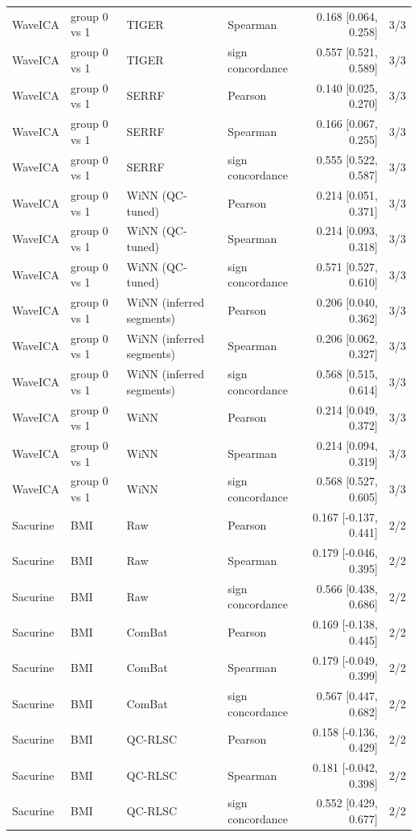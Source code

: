 \begin{landscape}
\begin{longtable}{llllrr}
WaveICA & group 0 vs 1 & TIGER & Spearman & 0.168 [0.064, 0.258] & 3/3 \\
WaveICA & group 0 vs 1 & TIGER & sign concordance & 0.557 [0.521, 0.589] & 3/3 \\
WaveICA & group 0 vs 1 & SERRF & Pearson & 0.140 [0.025, 0.270] & 3/3 \\
WaveICA & group 0 vs 1 & SERRF & Spearman & 0.166 [0.067, 0.255] & 3/3 \\
WaveICA & group 0 vs 1 & SERRF & sign concordance & 0.555 [0.522, 0.587] & 3/3 \\
WaveICA & group 0 vs 1 & WiNN (QC-tuned) & Pearson & 0.214 [0.051, 0.371] & 3/3 \\
WaveICA & group 0 vs 1 & WiNN (QC-tuned) & Spearman & 0.214 [0.093, 0.318] & 3/3 \\
WaveICA & group 0 vs 1 & WiNN (QC-tuned) & sign concordance & 0.571 [0.527, 0.610] & 3/3 \\
WaveICA & group 0 vs 1 & WiNN (inferred segments) & Pearson & 0.206 [0.040, 0.362] & 3/3 \\
WaveICA & group 0 vs 1 & WiNN (inferred segments) & Spearman & 0.206 [0.062, 0.327] & 3/3 \\
WaveICA & group 0 vs 1 & WiNN (inferred segments) & sign concordance & 0.568 [0.515, 0.614] & 3/3 \\
WaveICA & group 0 vs 1 & WiNN & Pearson & 0.214 [0.049, 0.372] & 3/3 \\
WaveICA & group 0 vs 1 & WiNN & Spearman & 0.214 [0.094, 0.319] & 3/3 \\
WaveICA & group 0 vs 1 & WiNN & sign concordance & 0.568 [0.527, 0.605] & 3/3 \\
Sacurine & BMI & Raw & Pearson & 0.167 [-0.137, 0.441] & 2/2 \\
Sacurine & BMI & Raw & Spearman & 0.179 [-0.046, 0.395] & 2/2 \\
Sacurine & BMI & Raw & sign concordance & 0.566 [0.438, 0.686] & 2/2 \\
Sacurine & BMI & ComBat & Pearson & 0.169 [-0.138, 0.445] & 2/2 \\
Sacurine & BMI & ComBat & Spearman & 0.179 [-0.049, 0.399] & 2/2 \\
Sacurine & BMI & ComBat & sign concordance & 0.567 [0.447, 0.682] & 2/2 \\
Sacurine & BMI & QC-RLSC & Pearson & 0.158 [-0.136, 0.429] & 2/2 \\
Sacurine & BMI & QC-RLSC & Spearman & 0.181 [-0.042, 0.398] & 2/2 \\
Sacurine & BMI & QC-RLSC & sign concordance & 0.552 [0.429, 0.677] & 2/2 \\

\end{longtable}
\end{landscape}
